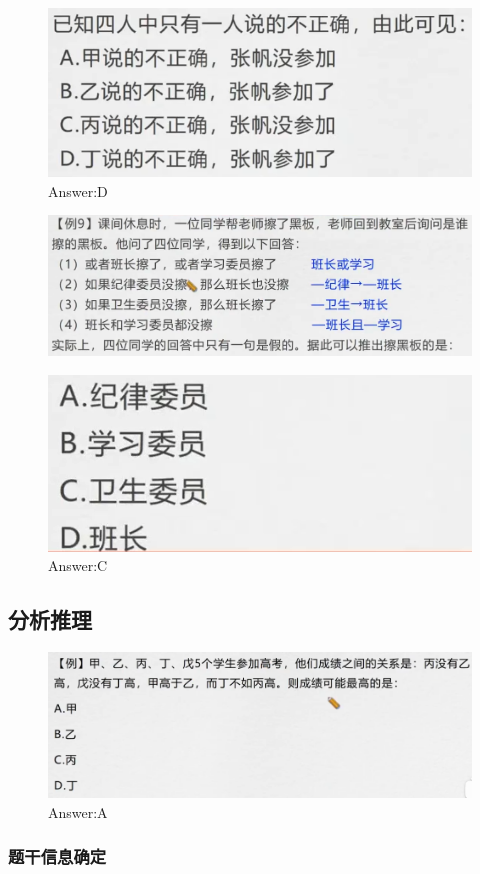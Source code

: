 \documentclass{article}
\numberwithin{equation}{section}						%
\numberwithin{figure}{section}							%
\begin{document}
\begin{sloppypar}
\begin{figure}[H]
\end{figure}

\begin{figure}[H]
     \centering
     \includegraphics[width=0.4\linewidth]{182.png}
		\caption{Answer:D}
\end{figure}


\begin{figure}[H]
     \centering
     \includegraphics[width=0.6\linewidth]{183.png}
	
\end{figure}

\begin{figure}[H]
     \centering
     \includegraphics[width=0.3\linewidth]{184.png}
		\caption{Answer:C}
\end{figure}


\subsection{分析推理}


\begin{figure}[H]
     \centering
     \includegraphics[width=0.6\linewidth]{185.png}
		\caption{Answer:A}
\end{figure}



\subsubsection{题干信息确定}


\end{sloppypar}
\end{document}

